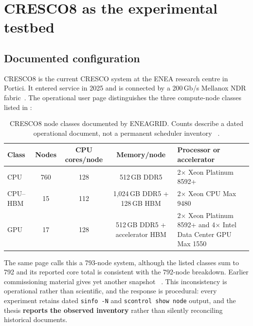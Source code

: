 
\section{CRESCO8 as the experimental testbed}
\label{sec:cresco8}

\subsection{Documented configuration}

CRESCO8 is the current CRESCO system at the ENEA research centre in
Portici.  It entered service in 2025 and is connected by a 200\,Gb/s
Mellanox NDR fabric~\cite{cresco8doc,eneapress}.  The operational user
page distinguishes the three compute-node classes listed in
:

\begin{table}[htbp]
\centering
\small
\tabsetup
\caption{CRESCO8 node classes documented by ENEAGRID.  Counts describe a
dated operational document, not a permanent scheduler inventory
~\cite{cresco8doc}.}
\label{tab:cresco8-node-classes}
\begin{tabularx}{\textwidth}{@{}lcccY@{}}
\toprule
\headrow
\textbf{Class} & \textbf{Nodes} & \textbf{CPU cores/node}
 & \textbf{Memory/node} & \textbf{Processor or accelerator} \\
\midrule
CPU
 & 760 & 128 & 512\,GB DDR5
 & 2$\times$ Xeon Platinum 8592+ \\
CPU--HBM
 & 15 & 112 & 1,024\,GB DDR5 + 128\,GB HBM
 & 2$\times$ Xeon CPU Max 9480 \\
GPU
 & 17 & 128 & 512\,GB DDR5 + accelerator HBM
 & 2$\times$ Xeon Platinum 8592+ and
   4$\times$ Intel Data Center GPU Max 1550 \\
\bottomrule
\end{tabularx}
\end{table}

The same page calls this a 793-node system, although the listed classes
sum to 792 and its reported core total is consistent with the 792-node
breakdown.  Earlier commissioning material gives yet another snapshot
~\cite{eneacresco8slides}.  This inconsistency is operational rather than scientific, and the
response is procedural: every experiment retains dated
\texttt{sinfo -N} and \texttt{scontrol show node} output, and the thesis
\textbf{reports the observed inventory} rather than silently reconciling
historical documents.


